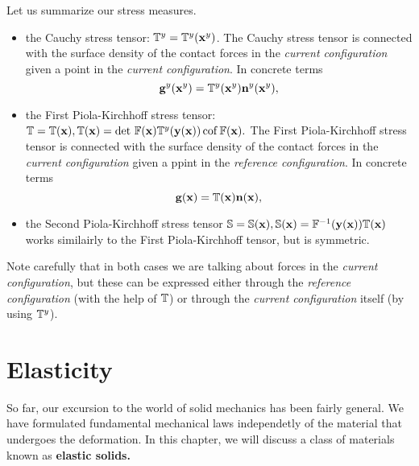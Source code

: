 \documentclass[11pt]{scrartcl} %
\begin{document}
\begin{remark}
    Let us summarize our stress measures.
    \begin{itemize}
	    \item the Cauchy stress tensor: $\mathbb{T}^y = \mathbb{T}^y\qty(\vb{x}^{y})$. The Cauchy stress tensor is connected with the surface density of the contact forces in the \textit{current configuration} given a point in the \textit{current configuration}. In concrete terms
		    \[
			    \vb{g}^{y}\qty(\vb{x}^{y}) = \mathbb{T}^y\qty(\vb{x}^{y})\vb{n}^{y}\qty(\vb{x}^{y}),
		    \]
	    \item the First Piola-Kirchhoff stress tensor: $\mathbb{T} = \mathbb{T}(\vb{x}), \mathbb{T}\qty(\vb{x}) = \det\, \mathbb{F} \qty(\vb{x}) \mathbb{T}^y\qty(\vb{y}\qty(\vb{x})) \operatorname{cof} \mathbb{F} \qty(\vb{x}).$ The First Piola-Kirchhoff stress tensor is connected with the surface density of the contact forces in the \textit{current configuration} given a ppint in the \textit{reference configuration}. In concrete terms
		    \[
			    \vb{g}\qty(\vb{x}) = \mathbb{T}\qty(\vb{x}) \vb{n}\qty(\vb{x}),
		    \]
	    \item the Second Piola-Kirchhoff stress tensor $\mathbb{S} = \mathbb{S}\qty(\vb{x}), \mathbb{S}\qty(\vb{x}) = \mathbb{F}^{-1}\qty(\vb{y}\qty(\vb{x})) \mathbb{T}\qty(\vb{x})$ works similairly to the First Piola-Kirchhoff tensor, but is symmetric.
    \end{itemize}
    Note carefully that in both cases we are talking about forces in the \textit{current configuration}, but these can be expressed either through the \textit{reference configuration} (with the help of $\mathbb{T}$) or through the \textit{current configuration} itself (by using $\mathbb{T}^y$).
\end{remark}

\section{Elasticity}
\label{sec:elasticity}
So far, our excursion to the world of solid mechanics has been fairly general. We have formulated fundamental mechanical laws independetly of the material that undergoes the deformation. In this chapter, we will discuss a class of materials known as \textbf{elastic solids.}
\end{document}
